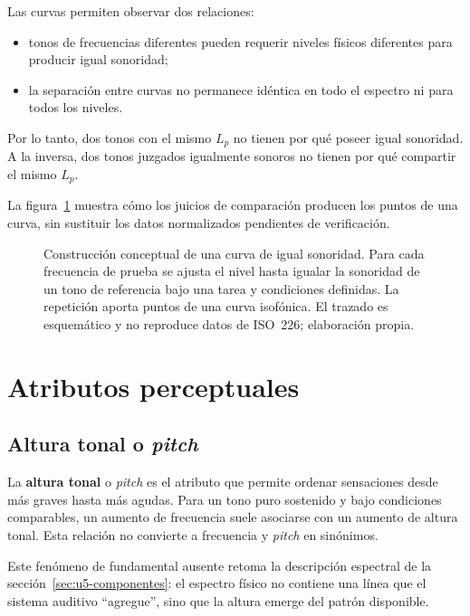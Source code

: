 Las curvas permiten observar dos relaciones:

\begin{itemize}
    \item tonos de frecuencias diferentes pueden requerir niveles físicos
    diferentes para producir igual sonoridad;
    \item la separación entre curvas no permanece idéntica en todo el espectro
    ni para todos los niveles.
\end{itemize}

Por lo tanto, dos tonos con el mismo \(L_p\) no tienen por qué poseer igual
sonoridad. A la inversa, dos tonos juzgados igualmente sonoros no tienen por
qué compartir el mismo \(L_p\).

La figura~\ref{fig:isofonicas} muestra cómo los juicios de comparación producen
los puntos de una curva, sin sustituir los datos normalizados pendientes de
verificación.

\begin{figure}[htbp]
    \centering
    
    \caption{Construcción conceptual de una curva de igual sonoridad. Para cada
    frecuencia de prueba se ajusta el nivel hasta igualar la sonoridad de un
    tono de referencia bajo una tarea y condiciones definidas. La repetición
    aporta puntos de una curva isofónica. El trazado es esquemático y no
    reproduce datos de ISO~226; elaboración propia.}
    \label{fig:isofonicas}
\end{figure}

\section{Atributos perceptuales}
\label{sec:u7-atributos}

\subsection{Altura tonal o \emph{pitch}}
\label{sec:u7-pitch}

La \textbf{altura tonal} o \emph{pitch} es el atributo que permite ordenar
sensaciones desde más graves hasta más agudas. Para un tono puro sostenido y
bajo condiciones comparables, un aumento de frecuencia suele asociarse con un
aumento de altura tonal. Esta relación no convierte a frecuencia y
\emph{pitch} en sinónimos.

 Este fenómeno de fundamental ausente
retoma la descripción espectral de la sección~\ref{sec:u5-componentes}: el
espectro físico no contiene una línea que el sistema auditivo ``agregue'', sino
que la altura emerge del patrón disponible.

